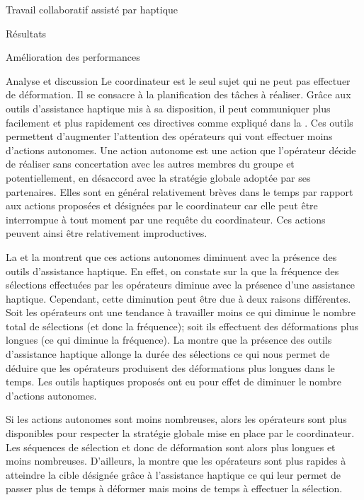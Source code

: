 \documentclass[myfrancais,ngerman,english,french]{mythesis}
\begin{document}
\begin{mychapter}{Travail collaboratif assisté par haptique}
\begin{mysection}{Résultats}
\begin{mysubsection}{Amélioration des performances}
\begin{mysubsubsection}{Analyse et discussion}
					Le coordinateur est le seul sujet qui ne peut pas effectuer de déformation.
					Il se consacre à la planification des tâches à réaliser.
					Grâce aux outils d'assistance haptique mis à sa disposition, il peut communiquer plus facilement et plus rapidement ces directives comme expliqué dans la .
					Ces outils permettent d'augmenter l'attention des opérateurs qui vont effectuer moins d'actions autonomes.
					Une action autonome est une action que l'opérateur décide de réaliser sans concertation avec les autres membres du groupe et potentiellement, en désaccord avec la stratégie globale adoptée par ses partenaires.
					Elles sont en général relativement brèves dans le temps par rapport aux actions proposées et désignées par le coordinateur car elle peut être interrompue à tout moment par une requête du coordinateur.
					Ces actions peuvent ainsi être relativement improductives.

					La  et la  montrent que ces actions autonomes diminuent avec la présence des outils d'assistance haptique.
					En effet, on constate sur la  que la fréquence des sélections effectuées par les opérateurs diminue avec la présence d'une assistance haptique.
					Cependant, cette diminution peut être due à deux raisons différentes.
					Soit les opérateurs ont une tendance à travailler moins ce qui diminue le nombre total de sélections (et donc la fréquence); soit ils effectuent des déformations plus longues (ce qui diminue la fréquence).
					La  montre que la présence des outils d'assistance haptique allonge la durée des sélections ce qui nous permet de déduire que les opérateurs produisent des déformations plus longues dans le temps.
					Les outils haptiques proposés ont eu pour effet de diminuer le nombre d'actions autonomes.

					Si les actions autonomes sont moins nombreuses, alors les opérateurs sont plus disponibles pour respecter la stratégie globale mise en place par le coordinateur.
					Les séquences de sélection et donc de déformation sont alors plus longues et moins nombreuses.
					D'ailleurs, la  montre que les opérateurs sont plus rapides à atteindre la cible désignée grâce à l'assistance haptique ce qui leur permet de passer plus de temps à déformer mais moins de temps à effectuer la sélection.


\end{mysubsubsection}
\end{mysubsection}
\end{mysection}
\end{mychapter}
\end{document}
